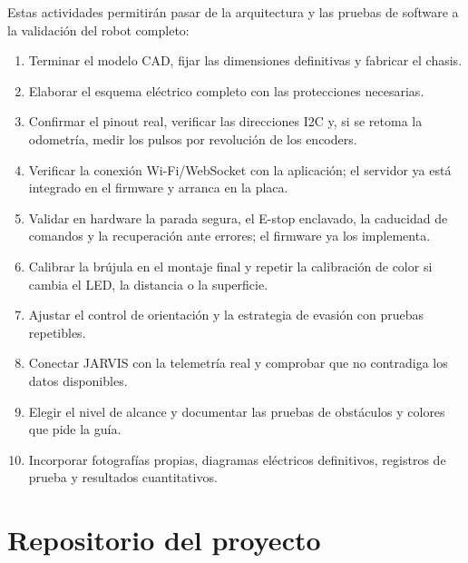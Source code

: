\documentclass[journal]{IEEEtran}
\begin{document}
Estas actividades permitirán pasar de la arquitectura y las pruebas de software a la validación del robot completo:

\begin{enumerate}[1.]
    \item Terminar el modelo CAD, fijar las dimensiones definitivas y fabricar el chasis.

    \item Elaborar el esquema eléctrico completo con las protecciones necesarias.

    \item Confirmar el pinout real, verificar las direcciones I2C y, si se retoma la odometría, medir los pulsos por revolución de los encoders.

    \item Verificar la conexión Wi-Fi/WebSocket con la aplicación; el servidor ya está integrado en el firmware y arranca en la placa.

    \item Validar en hardware la parada segura, el E-stop enclavado, la caducidad de comandos y la recuperación ante errores; el firmware ya los implementa.

    \item Calibrar la brújula en el montaje final y repetir la calibración de color si cambia el LED, la distancia o la superficie.

    \item Ajustar el control de orientación y la estrategia de evasión con pruebas repetibles.

    \item Conectar JARVIS con la telemetría real y comprobar que no contradiga los datos disponibles.

    \item Elegir el nivel de alcance y documentar las pruebas de obstáculos y colores que pide la guía.

    \item Incorporar fotografías propias, diagramas eléctricos definitivos, registros de prueba y resultados cuantitativos.
\end{enumerate}


\section{Repositorio del proyecto}
\end{document}
